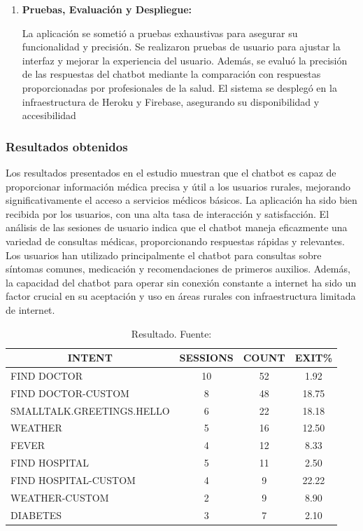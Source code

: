 \begin{enumerate}
		\item \textbf{Pruebas, Evaluación y Despliegue:}
		
			\subitem La aplicación se sometió a pruebas exhaustivas para asegurar su funcionalidad y precisión. Se realizaron pruebas de usuario para ajustar la interfaz y mejorar la experiencia del usuario. Además, se evaluó la precisión de las respuestas del chatbot mediante la comparación con respuestas proporcionadas por profesionales de la salud. El sistema se desplegó en la infraestructura de Heroku y Firebase, asegurando su disponibilidad y accesibilidad
			
		\end{enumerate}

	\subsubsection{Resultados obtenidos}
		Los resultados presentados en el estudio muestran que el chatbot es capaz de proporcionar información médica precisa y útil a los usuarios rurales, mejorando significativamente el acceso a servicios médicos básicos. La aplicación ha sido bien recibida por los usuarios, con una alta tasa de interacción y satisfacción. El análisis de las sesiones de usuario indica que el chatbot maneja eficazmente una variedad de consultas médicas, proporcionando respuestas rápidas y relevantes. Los usuarios han utilizado principalmente el chatbot para consultas sobre síntomas comunes, medicación y recomendaciones de primeros auxilios. Además, la capacidad del chatbot para operar sin conexión constante a internet ha sido un factor crucial en su aceptación y uso en áreas rurales con infraestructura limitada de internet.
	\begin{table}[H]
		\centering
			\begin{tabular}{l|ccc}
				\multicolumn{1}{c|}{INTENT} & \multicolumn{1}{c|}{SESSIONS} & \multicolumn{1}{c|}{COUNT} & \multicolumn{1}{c|}{EXIT\%} \\ \hline
				FIND DOCTOR & 10 & 52 & 1.92 \\
				FIND DOCTOR-CUSTOM & 8 & 48 & 18.75 \\
				SMALLTALK.GREETINGS.HELLO & 6 & 22 & 18.18 \\
				WEATHER & 5 & 16 & 12.50 \\
				FEVER & 4 & 12 & 8.33 \\
				FIND HOSPITAL & 5 & 11 & 2.50 \\
				FIND HOSPITAL-CUSTOM & 4 & 9 & 22.22 \\
				WEATHER-CUSTOM & 2 & 9 & 8.90 \\
				DIABETES & 3 & 7 & 2.10 \\ \hline
			\end{tabular}
		\caption{Resultado. Fuente: \cite{IntelligentChatbot_2020}}
	\end{table}


